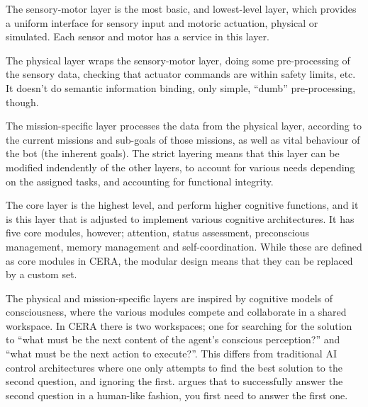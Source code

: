 The sensory-motor layer is the most basic, and lowest-level layer, which
provides a uniform interface for sensory input and motoric actuation, physical
or simulated. Each sensor and motor has a service in this layer.

The physical layer wraps the sensory-motor layer, doing some pre-processing of
the sensory data, checking that actuator commands are within safety limits,
etc. It doesn't do semantic information binding, only simple, ``dumb''
pre-processing, though.

The mission-specific layer processes the data from the physical layer,
according to the current missions and sub-goals of those missions, as well as
vital behaviour of the bot (the inherent goals). The strict layering means that
this layer can be modified indendently of the other layers, to account for
various needs depending on the assigned tasks, and accounting for functional
integrity.

The core layer is the highest level, and perform higher cognitive functions,
and it is this layer that is adjusted to implement various cognitive
architectures. It has five core modules, however; attention, status assessment,
preconscious management, memory management and self-coordination. While these
are defined as core modules in CERA, the modular design means that they can be
replaced by a custom set.

The physical and mission-specific layers are inspired by cognitive models of
consciousness, where the various modules compete and collaborate in a shared
workspace. In CERA there is two workspaces; one for searching for the solution
to ``what must be the next content of the agent's conscious perception?'' and
``what must be the next action to execute?''. This differs from traditional AI
control architectures where one only attempts to find the best solution to the
second question, and ignoring the first. \cite{arrabales2009ceracranium} argues
that to successfully answer the second question in a human-like fashion, you
first need to answer the first one.

